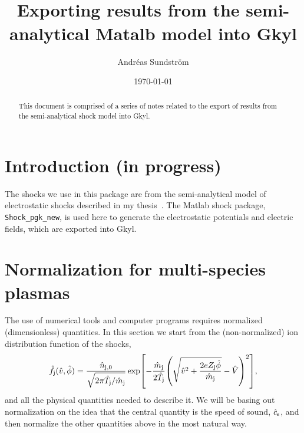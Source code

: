 \documentclass[11pt,a4paper, 
swedish, english %
]{article}
\begin{document}

\title{\vspace{-5em}{\bf Instruction notes}\\[0.4ex]
  \Large Exporting results from the semi-analytical Matalb model into Gkyl}
\author{Andréas Sundström}
\date{\today}

\maketitle

\begin{abstract}
\noindent
This document is comprised of a series of notes related to the export
of results from the semi-analytical shock model into Gkyl. 
\end{abstract}

\tableofcontents
\thispagestyle{empty}
\clearpage
\setcounter{page}{1}



\section{Introduction (in progress)}
The shocks we use in this package are from the semi-analytical model
of electrostatic shocks described in my
thesis~\cite{Sundstrom2018}. The Matlab shock package,
\texttt{Shock\_pgk\_new}, is used here to generate the electrostatic
potentials and electric fields, which are exported into Gkyl.


\section{Normalization for multi-species plasmas}
\label{sec:norm}
The use of numerical tools and computer programs requires normalized
(dimensionless) quantities\footnotemark{}. In this section we start
from the (non-normalized) ion distribution function of the shocks,
\begin{equation}\label{eq:fj}
\hat{f}_{\mathrm{j}}(\hat{v},\hat{\phi})
=\frac{\hat{n}_{\mathrm{j},0}}{\sqrt{2\pi \hat{T}_{\mathrm{j}}/\hat{m}_{\mathrm{j}}}}
\exp[-\frac{\hat{m}_{\mathrm{j}}}{2\hat{T}_{\mathrm{j}}}
\qty(\sqrt{\hat{v}^2+\frac{2eZ_{\mathrm{j}}\hat{\phi}}{\hat{m}_{\mathrm{j}}}}
-\hat{V})^2],
\end{equation}
and all the physical quantities needed to describe it. We will be
basing out normalization on the idea that the central quantity is 
the speed of sound, $\hat{c}_{\text{s}}$, and then normalize the other quantities
above in the most natural way.
\end{document}
